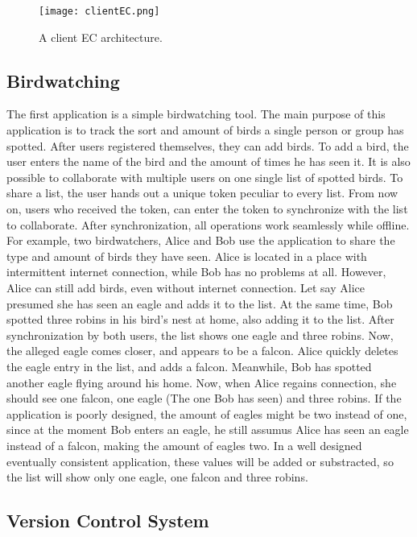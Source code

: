 \documentclass[a4paper,12pt]{report}
\begin{document}
\begin{figure}
    \small
    \centering
    \texttt{[image: clientEC.png]}
    \caption{A client EC architecture.}
    \label{fig:clientEC}
\end{figure}

\subsection{Birdwatching}\label{subsec:Birdwatching}

The first application is a simple birdwatching tool. The main purpose of this application is to track the sort and amount of birds a single person or group has spotted. After users registered themselves, they can add birds. To add a bird, the user enters the name of the bird and the amount of times he has seen it. It is also possible to collaborate with multiple users on one single list of spotted birds. To share a list, the user hands out a unique token peculiar to every list. From now on, users who received the token, can enter the token to synchronize with the list to collaborate. After synchronization, all operations work seamlessly while offline. For example, two birdwatchers, Alice and Bob use the application to share the type and amount of birds they have seen. Alice is located in a place with intermittent internet connection, while Bob has no problems at all. However, Alice can still add birds, even without internet connection. Let say Alice presumed she has seen an eagle and adds it to the list. At the same time, Bob spotted three robins in his bird's nest at home, also adding it to the list. After synchronization by both users, the list shows one eagle and three robins. Now, the alleged eagle comes closer, and appears to be a falcon. Alice quickly deletes the eagle entry in the list, and adds a falcon. Meanwhile, Bob has spotted another eagle flying around his home. Now, when Alice regains connection, she should see one falcon, one eagle (The one Bob has seen) and three robins. If the application is poorly designed, the amount of eagles might be two instead of one, since at the moment Bob enters an eagle, he still assumus Alice has seen an eagle instead of a falcon, making the amount of eagles two. In a well designed eventually consistent application, these values will be added or substracted, so the list will show only one eagle, one falcon and three robins.

\subsection{Version Control System}\label{subsec:VCS}
\end{document}
